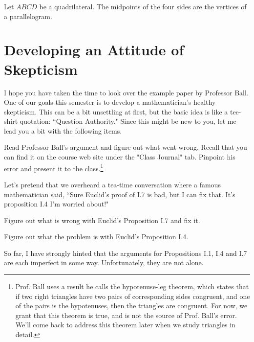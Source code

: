 \begin{conjecture}\label{conj:Varignon}
Let $ABCD$ be a quadrilateral. The midpoints of the four sides are the vertices of a parallelogram.
\end{conjecture}




\chapter{Developing an Attitude of Skepticism}

I hope you have taken the time to look over the example paper by Professor Ball.
One of our goals this semester is to develop a mathematician's healthy skepticism.
This can be a bit unsettling at first, but the basic idea is like a tee-shirt quotation: ``Question Authority."
Since this might be new to you, let me lead you a bit with the following items.

\begin{problem}\label{prob:Ball}
Read Professor Ball's argument and figure out what went wrong.
Recall that you can find it on the course web site under the "Class Journal" tab.
Pinpoint his error and present it to the class.\footnote{Prof. Ball uses a result he calls the hypotenuse-leg theorem, which states that if two right triangles have two pairs of corresponding sides congruent, and one of the pairs is the hypotenuses, then the triangles are congruent. For now, we grant that this theorem is true, and is not the source of Prof. Ball's error. We'll come back to address this theorem later when we study triangles in detail.}
\end{problem}

Let's pretend that we overheard a tea-time conversation where a famous mathematician said, ``Sure Euclid's proof of I.7 is bad, but I can fix that.
It's proposition I.4 I'm worried about!"

\begin{problem}\label{prob:fix-I.7}
Figure out what is wrong with Euclid's Proposition I.7 and fix it.
\end{problem}

\begin{problem}\label{prob:fix-I.4}
Figure out what the problem is with Euclid's Proposition I.4.
\end{problem}

So far, I have strongly hinted that the arguments for Propositions I.1, I.4 and I.7 are each imperfect in some way.
Unfortunately, they are not alone.

